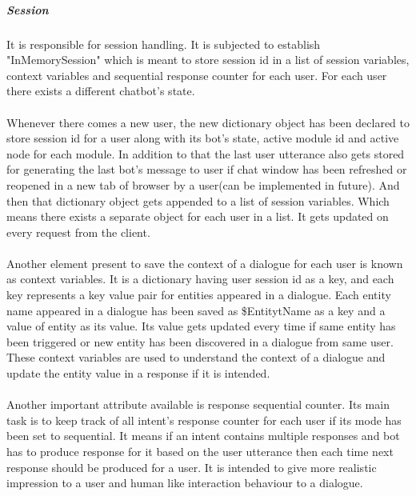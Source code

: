 \subparagraph*{Session}
It is responsible for session handling. It is subjected to establish "InMemorySession" which is meant to store session id in a list of session variables, context variables and sequential response counter for each user. For each user there exists a different chatbot's state. 
\\~\\
Whenever there comes a new user, the new dictionary object has been declared to store session id for a user along with its bot's state, active module id and active node for each module. In addition to that the last user utterance also gets stored for generating the last bot's message to user if chat window has been refreshed or reopened in a new tab of browser by a user(can be implemented in future). And then that dictionary object gets appended to a list of session variables. Which means there exists a separate object for each user in a list. It gets updated on every request from the client.
\\~\\
Another element present to save the context of a dialogue for each user is known as context variables. It is a dictionary having user session id as a key, and each key represents a key value pair for entities appeared in a dialogue. Each entity name appeared in a dialogue has been saved as \$EntitytName as a key and a value of entity as its value. Its value gets updated every time if same entity has been triggered or new entity has been discovered in a dialogue from same user. These context variables are used to understand the context of a dialogue and update the entity value in a response if it is intended.
\\~\\
Another important attribute available is response sequential counter. Its main task is to keep track of all intent's response counter for each user if its mode has been set to sequential. It means if an intent contains multiple responses and bot has to produce response for it based on the user utterance then each time next response should be produced for a user. It is intended to give more realistic impression to a user and human like interaction behaviour to a dialogue.

